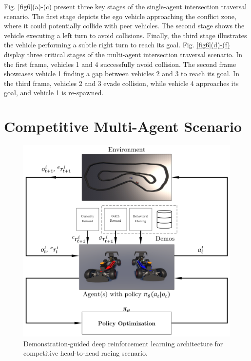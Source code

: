 \documentclass[letterpaper, 10 pt, conference]{ieeeconf}  %
\begin{document}
Fig. \hyperref[fig6]{\ref*{fig6}(a)-(c)} present three key stages of the single-agent intersection traversal scenario. The first stage depicts the ego vehicle approaching the conflict zone, where it could potentially collide with peer vehicles. The second stage shows the vehicle executing a left turn to avoid collisions. Finally, the third stage illustrates the vehicle performing a subtle right turn to reach its goal. Fig. \hyperref[fig6]{\ref*{fig6}(d)-(f)} display three critical stages of the multi-agent intersection traversal scenario. In the first frame, vehicles 1 and 4 successfully avoid collision. The second frame showcases vehicle 1 finding a gap between vehicles 2 and 3 to reach its goal. In the third frame, vehicles 2 and 3 evade collision, while vehicle 4 approaches its goal, and vehicle 1 is re-spawned.


\section{Competitive Multi-Agent Scenario}
\label{Section: Competitive Multi-Agent Scenario}

\begin{figure}[ht]
     \centering
     \includegraphics[width=\linewidth]{Fig8.png}
     \caption{Demonstration-guided deep reinforcement learning architecture for competitive head-to-head racing scenario.}
     \label{fig8}
\end{figure}
\end{document}
